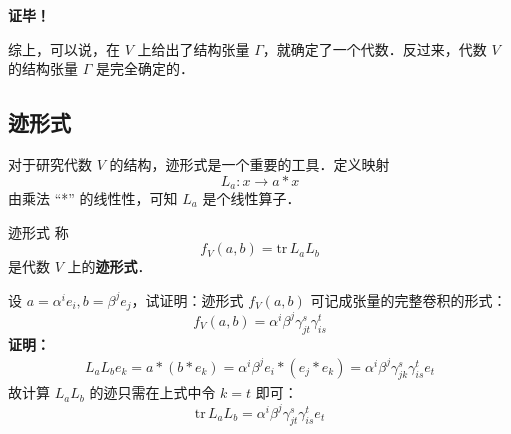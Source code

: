 \textbf{证毕！}

综上，可以说，在 $V$ 上给出了结构张量 $\Gamma$，就确定了一个代数．反过来，代数 $V$ 的结构张量 $\Gamma$ 是完全确定的．
\subsection{迹形式}

对于研究代数 $V$ 的结构，迹形式是一个重要的工具．定义映射
\begin{equation}
L_a:x\rightarrow a*x
\end{equation}
由乘法 “*” 的线性性，可知 $L_a$ 是个线性算子．
\begin{definition}{迹形式}
称
\begin{equation}
f_V(a,b)=\mathrm{tr}\, L_aL_b
\end{equation}
是代数 $V$ 上的\textbf{迹形式}．
\end{definition}
\begin{example}{}
设 $a=\alpha^i e_i,b=\beta^j e_j$，试证明：迹形式 $f_V(a,b)$ 可记成张量的完整卷积的形式：
\begin{equation}
f_V(a,b)=\alpha^i\beta^j\gamma_{jt}^s\gamma_{is}^t
\end{equation}
\textbf{证明：}
\begin{equation}
\begin{aligned}
L_aL_b e_k=a*(b*e_k)=\alpha^i\beta^je_i*(e_j*e_k)=\alpha^i\beta^j\gamma_{jk}^s \gamma_{is}^t e_t
\end{aligned}
\end{equation}
故计算 $L_aL_b$ 的迹只需在上式中令 $k=t$ 即可：
\begin{equation}
\mathrm{tr}\, L_a L_b=\alpha^i\beta^j\gamma_{jt}^s \gamma_{is}^t e_t
\end{equation}

\end{example}